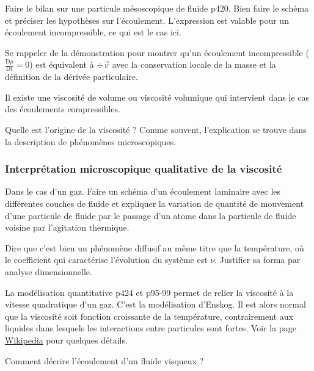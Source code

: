 Faire le bilan sur une particule mésoscopique de fluide \cite{Olivier2000} p420.
Bien faire le schéma et préciser les hypothèses sur l'écoulement.
L'expression est valable pour un écoulement incompressible, ce qui est le cas ici.

\begin{remarque}
Se rappeler de la démonstration pour montrer qu'un écoulement incompressible ($\frac{\mathrm{D}\rho}{\mathrm{D}t}=0$) est équivalent à $\div \overrightarrow{v}$ avec la conservation locale de la masse et la définition de la dérivée particulaire.

\noindent
Il existe une viscosité de volume ou viscosité volumique qui intervient dans le cas des écoulements compressibles.
\end{remarque}

\begin{transition}
Quelle est l'origine de la viscosité ?
Comme souvent, l'explication se trouve dans la description de phénomènes microscopiques.
\end{transition}

\subsubsection{Interprétation microscopique qualitative de la viscosité}

Dans le cas d'un gaz.
Faire un schéma d'un écoulement laminaire avec les différentes couches de fluide et expliquer la variation de quantité de mouvement d'une particule de fluide par le passage d'un atome dans la particule de fluide voisine par l'agitation thermique.

Dire que c'est bien un phénomène diffusif au même titre que la température, où le coefficient qui caractérise l'évolution du système est $\nu$.
Justifier sa forma par analyse dimensionnelle.

\begin{remarque}
La modélisation quantitative \cite{Olivier2000} p424 et \cite{Guyon2001} p95-99 permet de relier la viscosité à la vitesse quadratique d'un gaz.
C'est la modélisation d'Enskog.
Il est alors normal que la viscosité soit fonction croissante de la température, contrairement aux liquides dans lesquels les interactions entre particules sont fortes.
Voir la page \href{https://fr.wikipedia.org/wiki/Viscosit\%C3\%A9#Viscosit\%C3\%A9_des_liquides}{Wikipedia} pour quelques détails.
\end{remarque}

\begin{transition}
Comment décrire l'écoulement d'un fluide visqueux ?
\end{transition}

